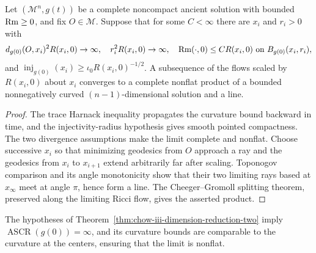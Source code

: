 \begin{theorem}
\label{thm:chow-iii-dimension-reduction-two}
Let \((\mathcal M^n,g(t))\) be a complete noncompact ancient solution with
bounded \(\operatorname{Rm}\ge0\), and fix \(O\in\mathcal M\).  Suppose that for some
\(C<\infty\) there are \(x_i\) and \(r_i>0\) with
\[
 d_{g(0)}(O,x_i)^2R(x_i,0)\to\infty,
 \quad r_i^2R(x_i,0)\to\infty,
 \quad \operatorname{Rm}(\cdot,0)\le CR(x_i,0)\ \text{on }B_{g(0)}(x_i,r_i),
\]
and \(\operatorname{inj}_{g(0)}(x_i)\ge\iota_0R(x_i,0)^{-1/2}\).  A
subsequence of the flows scaled by \(R(x_i,0)\) about \(x_i\) converges to a
complete nonflat product of a bounded nonnegatively curved
\((n-1)\)-dimensional solution and a line.
\end{theorem}
\begin{proof}
The trace Harnack inequality propagates the curvature bound backward in time,
and the injectivity-radius hypothesis gives smooth pointed compactness.  The
two divergence assumptions make the limit complete and nonflat.  Choose
successive \(x_i\) so that minimizing geodesics from \(O\) approach a ray and
the geodesics from \(x_i\) to \(x_{i+1}\) extend arbitrarily far after scaling.
Toponogov comparison and its angle monotonicity show that their two limiting
rays based at \(x_\infty\) meet at angle \(\pi\), hence form a line.  The
Cheeger--Gromoll splitting theorem, preserved along the limiting Ricci flow,
gives the asserted product.
\end{proof}

\begin{remark}
\label{rem:chow-iii-dimension-reduction-infinite-ascr}
The hypotheses of Theorem~\ref{thm:chow-iii-dimension-reduction-two} imply
\(\operatorname{ASCR}(g(0))=\infty\), and its curvature bounds are comparable
to the curvature at the centers, ensuring that the limit is nonflat.
\end{remark}

